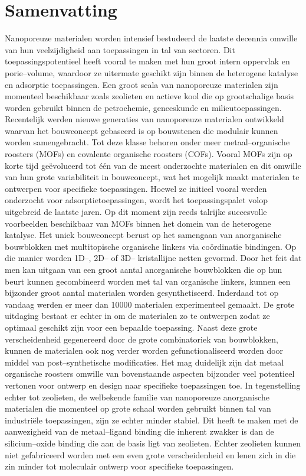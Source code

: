 \chapter{Samenvatting}
Nanoporeuze materialen worden intensief bestudeerd de laatste decennia omwille van hun veelzijdigheid aan toepassingen in tal van sectoren. Dit toepassingspotentieel heeft vooral te maken met hun groot intern oppervlak en porie--volume, waardoor ze uitermate geschikt zijn binnen de heterogene katalyse en adsorptie toepassingen. Een groot scala van nanoporeuze materialen zijn momenteel beschikbaar zoals zeolieten en actieve kool die op grootschalige basis worden gebruikt binnen de petrochemie, geneeskunde en milieutoepassingen. 
\npar
Recentelijk werden nieuwe generaties van nanoporeuze materialen ontwikkeld waarvan het bouwconcept gebaseerd is op bouwstenen die modulair kunnen worden samengebracht. Tot deze klasse behoren onder meer metaal--organische roosters (MOFs) en covalente organische roosters (COFs). Vooral MOFs zijn op korte tijd geëvolueerd tot één van de meest onderzochte materialen en dit omwille van hun grote variabiliteit in bouwconcept, wat het mogelijk maakt materialen te ontwerpen voor specifieke toepassingen. Hoewel ze initieel vooral werden onderzocht voor adsorptietoepassingen, wordt het toepassingspalet volop uitgebreid de laatste jaren. Op dit moment zijn reeds talrijke succesvolle voorbeelden beschikbaar van MOFs binnen het domein van de heterogene katalyse. 
\npar
Het uniek bouwconcept berust op het samengaan van anorganische bouwblokken met multitopische organische linkers via coördinatie bindingen. Op die manier worden 1D--, 2D-- of 3D-- kristallijne netten gevormd. Door het feit dat men kan uitgaan van een groot aantal anorganische bouwblokken die op hun beurt kunnen gecombineerd worden met tal van organische linkers, kunnen een bijzonder groot aantal materialen worden gesynthetiseerd. Inderdaad tot op vandaag werden er meer dan 10000 materialen experimenteel gemaakt. De grote uitdaging bestaat er echter in om de materialen zo te ontwerpen zodat ze optimaal geschikt zijn voor een bepaalde toepassing. Naast deze grote verscheidenheid gegenereerd door de grote combinatoriek van bouwblokken, kunnen de materialen ook nog verder worden gefunctionaliseerd worden door middel van post--synthetische modificaties. Het mag duidelijk zijn dat metaal organische roosters omwille van bovenstaande aspecten bijzonder veel potentieel vertonen voor ontwerp en design naar specifieke toepassingen toe. 
\npar
In tegenstelling echter tot zeolieten, de welbekende familie van nanoporeuze anorganische materialen die momenteel op grote schaal worden gebruikt binnen tal van industriële toepassingen, zijn ze echter minder stabiel. Dit heeft te maken met de aanwezigheid van de metaal--ligand binding die inherent zwakker is dan de silicium--oxide binding die aan de basis ligt van zeolieten. Echter zeolieten kunnen niet gefabriceerd worden met een even grote verscheidenheid en lenen zich in die zin minder tot moleculair ontwerp voor specifieke toepassingen. 
